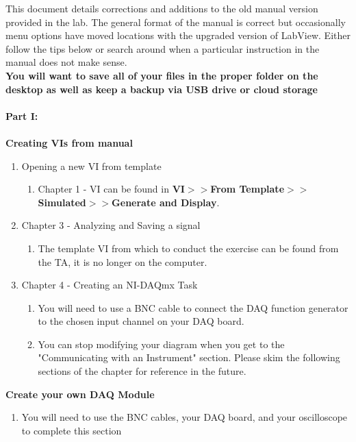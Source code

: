\documentclass[12pt]{article}
\begin{document}
\noindent
This document details corrections and additions to the old manual version provided in the lab. The general format of the manual is correct but occasionally menu options have moved locations with the upgraded version of LabView.  Either follow the tips below or search around when a particular instruction in the manual does not make sense.
\\
\textbf{You will want to save all of your files in the proper folder on the desktop as well as keep a backup via USB drive or cloud storage}\\\\
\textbf{Part I:}\\\\
\indent\textbf{Creating VIs from manual}
\begin{enumerate}
  \item Opening a new VI from template
  \begin{enumerate}
  	\item Chapter 1 - VI can be found in \textbf{VI$>>$From Template$>>$Simulated$>>$Generate and Display}. 
  \end{enumerate}
  \item Chapter 3 - Analyzing and Saving a signal
  \begin{enumerate}
  		\item The template VI from which to conduct the exercise can be found from the TA, it is no longer on the computer.
\end{enumerate}  
  \item Chapter 4 - Creating an NI-DAQmx Task
  \begin{enumerate}
  		\item You will need to use a BNC cable to connect the DAQ function generator to the chosen input channel on your DAQ board.
  		\item You can stop modifying your diagram when you get to the "Communicating with an Instrument" section.  Please skim the following sections of the chapter for reference in the future.
\end{enumerate}
\end{enumerate}

\textbf{Create your own DAQ Module}
\begin{enumerate}
  \item You will need to use the BNC cables, your DAQ board, and your oscilloscope to complete this section
 
  \end{enumerate}
  
\end{document}
